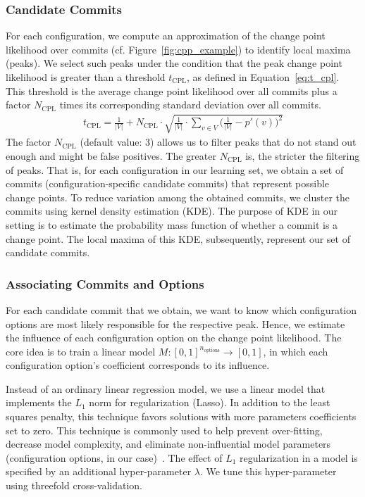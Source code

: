 \documentclass[sigconf]{acmart}
\begin{document}
	\subsubsection{Candidate Commits}
	For each configuration, we compute an approximation of the change point likelihood over commits (cf. Figure~\ref{fig:cpp_example}) to identify local maxima (peaks). We select such peaks under the condition that the peak change point likelihood is greater than a  threshold $t_\text{CPL}$, as defined in Equation~\ref{eq:t_cpl}. This threshold is the average change point likelihood over all commits plus a factor $N_\text{CPL}$ times its corresponding standard deviation over all commits. 
	\begin{equation}
	\begin{gathered}
	t_\text{CPL} = \frac{1}{\vert V\vert} + N_\text{CPL} \cdot \sqrt{\frac{1}{\vert V\vert} \cdot \sum_{v \in V} \Big(\frac{1}{\vert V\vert} - p'(v)\Big)^2}
		\label{eq:t_cpl}
	\end{gathered}
	\end{equation}
	The factor $N_\text{CPL}$ (default value: 3) allows us to filter peaks that do not stand out enough and might be false positives. The greater $N_\text{CPL}$ is, the stricter the filtering of peaks. That is, for each configuration in our learning set, we obtain a set of commits (configuration-specific candidate commits) that represent possible change points.
	To reduce variation among the obtained commits, we cluster the commits using kernel density estimation (KDE). The purpose of KDE in our setting is to estimate the probability mass function of whether a commit is a change point. The local maxima of this KDE, subsequently, represent our set of candidate commits.
	
	\subsubsection{Associating Commits and Options}
	For each candidate commit that we obtain, we want to know which configuration options are most likely responsible for the respective peak. Hence, we estimate the influence  of each configuration option on the change point likelihood. The core idea is to train a linear model $M: [0,1]^{n_{\text{options}}} \rightarrow [0,1]$, in which each configuration option's coefficient corresponds to its influence. 
	
	Instead of an ordinary linear regression model, we use a linear model that implements the $L_1$ norm for regularization (Lasso). In addition to the least squares penalty, this technique favors solutions with more parameters coefficients set to zero.
	This technique is commonly used to help prevent over-fitting, decrease model complexity, and eliminate non-influential model parameters (configuration options, in our case)~\cite{lasso}. The effect of $L_1$ regularization in a model is specified by an additional hyper-parameter $\lambda$. We tune this hyper-parameter using threefold cross-validation.
	
\end{document}
